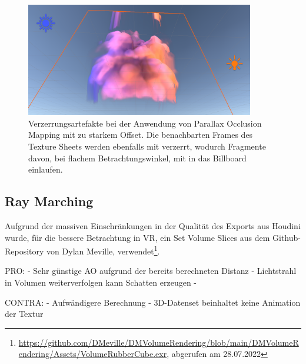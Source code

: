 \begin{figure}[h!]
	\includegraphics[width=0.89\textwidth]{Grafiken/Evaluation/Smoke_artefacts.png}
	\centering
	\begin{footnotesize}
		\caption{Verzerrungsartefakte bei der Anwendung von Parallax Occlusion Mapping mit zu starkem Offset. Die benachbarten Frames des Texture Sheets
			werden ebenfalls mit verzerrt, wodurch Fragmente davon, bei flachem Betrachtungswinkel, mit in das Billboard einlaufen.}
		\label{fig:smokeBleeding}
	\end{footnotesize}
\end{figure}



\subsection{Ray Marching}
\label{sec:5.2}

Aufgrund der massiven Einschränkungen in der Qualität des Exports aus Houdini wurde, für die bessere Betrachtung in VR, ein Set Volume Slices aus dem Github-Repository von Dylan Meville, 
verwendet\footnote{\url{https://github.com/DMeville/DMVolumeRendering/blob/main/DMVolumeRendering/Assets/VolumeRubberCube.exr}, abgerufen am 28.07.2022}.



PRO: \newline
- Sehr günstige AO aufgrund der bereits berechneten Distanz\newline
- Lichtstrahl in Volumen weiterverfolgen kann Schatten erzeugen\newline
-

CONTRA: \newline
- Aufwändigere Berechnung\newline
- 3D-Datenset beinhaltet keine Animation der Textur\newline




